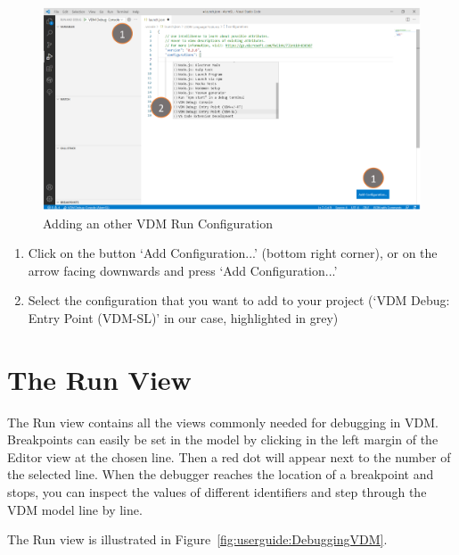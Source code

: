 \documentclass{overturerepchap}
\begin{document}
\begin{figure}[htp]
\begin{center}
  \includegraphics[width=460px]{snapshots/Add Configuration.PNG}
  \caption{Adding an other VDM Run Configuration}
  \label{fig:userguide:AddingOtherConfig}
\end{center}
\end{figure}

\begin{enumerate}
    \item Click on the button ‘Add Configuration...’ (bottom right corner), or on the arrow facing downwards and press ‘Add Configuration...’
    \item Select the configuration that you want to add to your project (‘VDM Debug: Entry Point (VDM-SL)’ in our case, highlighted in grey)
\end{enumerate}

\clearpage
\section{The Run View}

The Run view contains all the views
commonly needed for debugging in VDM. Breakpoints can easily be set in the
model by clicking in the left margin of the Editor view at the chosen
line. Then a red dot will appear next to the number of the selected line. When the debugger reaches the location of a breakpoint and stops, you can
inspect the values of different identifiers and step through the VDM model
line by line.

The Run view is illustrated in Figure~\ref{fig:userguide:DebuggingVDM}.
\end{document}
